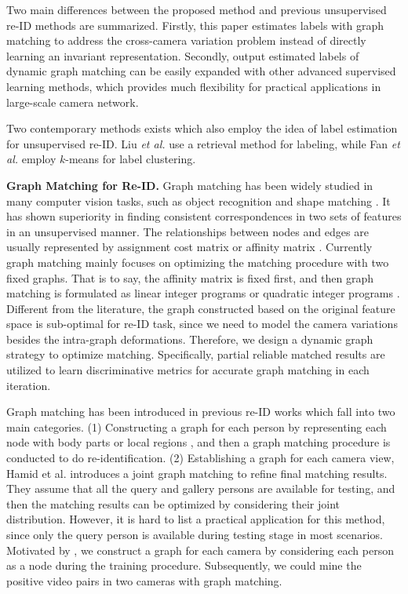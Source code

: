 \documentclass[10pt,twocolumn,letterpaper]{article}
\begin{document}
Two main differences between the proposed method and previous unsupervised re-ID methods are summarized. Firstly, this paper estimates labels with graph matching to address the cross-camera variation problem instead of directly learning an invariant representation.  Secondly, output estimated labels of dynamic graph matching can be easily expanded with other advanced supervised learning methods, which provides much flexibility for practical applications in large-scale camera network.

Two contemporary methods exists \cite{iccv17labeling,fan2017unsupervised} which also employ the idea of label estimation for unsupervised re-ID. Liu \emph{et al.} \cite{iccv17labeling} use a retrieval method for labeling, while Fan \emph{et al.} \cite{fan2017unsupervised} employ $k$-means for label clustering.




\textbf{Graph Matching for Re-ID.}
Graph matching has been widely studied in many computer vision tasks, such as object recognition and shape matching \cite{pami16gm}. It has shown superiority in finding consistent correspondences in two sets of features in an unsupervised manner. The relationships between nodes and edges are usually represented by assignment cost matrix \cite{ijcv12gm,iccv15joint} or affinity matrix \cite{cho10rrwm,pami16gm}. Currently graph matching mainly focuses on optimizing the matching procedure with two fixed graphs. That is to say, the affinity matrix is fixed first, and then graph matching is formulated as linear integer programs \cite{iccv15joint} or quadratic integer programs \cite{ijcv12gm}. Different from the literature, the graph constructed based on the original feature space is sub-optimal for re-ID task, since we need to model the camera variations besides the intra-graph deformations. Therefore, we design a dynamic graph strategy to optimize matching. Specifically, partial reliable matched results are utilized to learn discriminative metrics for accurate graph matching in each iteration.


Graph matching has been introduced in previous re-ID works which fall into two main categories. (1) Constructing a graph for each person by representing each node with body parts \cite{iccv13gm} or local regions \cite{tcsvt16gm}, and then a graph matching procedure is conducted to do re-identification. (2) Establishing a graph for each camera view, Hamid et al. \cite{cvpr16graph} introduces a joint graph matching to refine final matching results. They assume that all the query and gallery persons are available for testing, and then the matching results can be optimized by considering their joint distribution. However, it is hard to list a practical application for this method, since only the query person is available during testing stage in most scenarios. Motivated by \cite{cvpr16graph}, we construct a graph for each camera by considering each person as a node during the training procedure. Subsequently, we could mine the positive video pairs in two cameras with graph matching.
\end{document}
